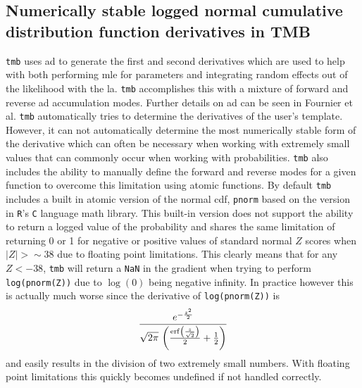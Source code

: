 \documentclass[11pt]{article}\usepackage[]{graphicx}\usepackage[]{color}
\begin{document}
\begin{appendices}
  \section{Numerically stable logged normal cumulative distribution function derivatives in TMB}\label{astable1}
  \texttt{\acrshort{tmb}} uses \acrfull{ad} to generate the first and second derivatives which are used to help with both performing \acrshort{mle} for parameters and integrating random effects out of the likelihood with the \acrfull{la}. \texttt{\acrshort{tmb}} accomplishes this with a mixture of forward and reverse \acrshort{ad} accumulation modes. Further details on \acrshort{ad} can be seen in Fournier et al\cite{Fournier_2012}. \texttt{\acrshort{tmb}} automatically tries to determine the derivatives of the user's template. However, it can not automatically determine the most numerically stable form of the derivative which can often be necessary when working with extremely small values that can commonly occur when working with probabilities. \texttt{\acrshort{tmb}} also includes the ability to manually define the forward and reverse modes for a given function to overcome this limitation using atomic functions. By default \texttt{\acrshort{tmb}} includes a built in atomic version of the normal \acrshort{cdf}, \texttt{pnorm} based on the version in \texttt{R}'s \texttt{C} language math library. This built-in version does not support the ability to return a logged value of the probability and shares the same limitation of returning 0 or 1 for negative or positive values of standard normal $Z$ scores when $|Z| > \sim 38$ due to floating point limitations. This clearly means that for any $Z < -38$, \texttt{\acrshort{tmb}} will return a \texttt{NaN} in the gradient when trying to perform \texttt{log(pnorm(Z))} due to $\log(0)$ being negative infinity. In practice however this is actually much worse since the derivative of \texttt{log(pnorm(Z))} is 
  \begin{equation}\label{derlNCDF}
    {{e^ {- {{z^2}\over{2}} }}\over{\sqrt{2\pi}\,\left({{
              \mathrm{erf}\left({{z}\over{\sqrt{2}}}\right)}\over{2}}+{{1}\over{2
            }}\right)}}
  \end{equation}
  and easily results in the division of two extremely small numbers. With floating point limitations this quickly becomes undefined if not handled correctly. 


\end{appendices}
\end{document}
